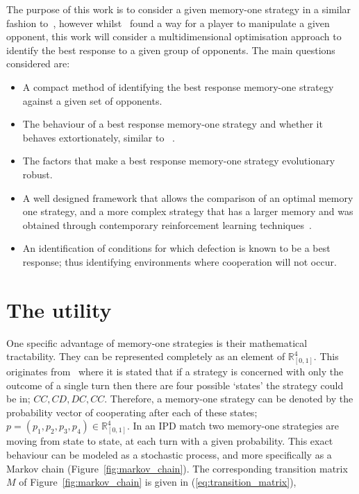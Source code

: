 \documentclass[10pt]{article}
\newcommand{\R}{\mathbb{R}}
\begin{document}
The purpose of this work is to consider a given memory-one strategy in a similar
fashion to~\cite{Press2012}, however whilst~\cite{Press2012} found a way for a
player to manipulate a given opponent, this work will consider a
multidimensional optimisation approach to identify the best response to a given
group of opponents. The main questions considered are:

\begin{itemize}
    \item A compact method of identifying the best response memory-one strategy
    against a given set of opponents.
    \item The behaviour of a best response memory-one strategy and whether it
    behaves extortionately, similar to ~\cite{Press2012}.
    \item The factors that make a best response memory-one strategy evolutionary
    robust.
    \item A well designed framework that allows the comparison of an optimal
          memory one strategy, and a more complex strategy that has a larger
          memory and was obtained through contemporary reinforcement learning
          techniques~\cite{Harper2017}.
    \item An identification of conditions for which defection is known to be a
    best response; thus identifying environments where cooperation will not
    occur.
\end{itemize}

\section{The utility}\label{section:utility}

One specific advantage of memory-one strategies is their mathematical
tractability. They can be represented completely as an element of \(\R^{4}_{[0, 1]}\). This
originates from~\cite{Nowak1989} where it is stated that if a strategy is
concerned with only the outcome of a single turn then there are four possible
`states' the strategy could be in; \(CC, CD, DC,CC\). Therefore, a memory-one
strategy can be denoted by the probability vector of cooperating after each of
these states; \(p=(p_1, p_2, p_3, p_4) \in \R_{[0,1]} ^ 4\). In an IPD match two
memory-one strategies are moving from state to state, at each turn with a given
probability. This exact behaviour can be modeled as a stochastic process, and
more specifically as a Markov chain (Figure~\ref{fig:markov_chain}). The
corresponding transition matrix \(M\) of Figure~\ref{fig:markov_chain} is given
in (\ref{eq:transition_matrix}),
\end{document}
